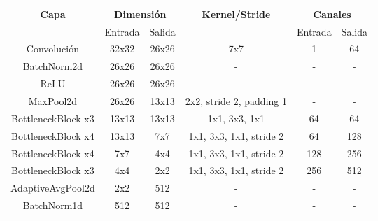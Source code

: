 \begin{table}[]
\begin{tabular}{|c|cc|c|cc|}
\hline
\multirow{2}{*}{\textbf{Capa}} & \multicolumn{2}{c|}{\textbf{Dimensión}}     & \multirow{2}{*}{\textbf{Kernel/Stride}} & \multicolumn{2}{c|}{\textbf{Canales}} \\ \cline{2-3} \cline{5-6} 
                               & \multicolumn{1}{c|}{Entrada} & Salida       &                                         & \multicolumn{1}{c|}{Entrada} & Salida \\ \hline
Convolución                    & \multicolumn{1}{c|}{32x32}   & 26x26        & 7x7                                     & \multicolumn{1}{c|}{1}       & 64     \\ \hline
BatchNorm2d                    & \multicolumn{1}{c|}{26x26}   & 26x26        & -                                       & \multicolumn{1}{c|}{-}        &   -     \\ \hline
ReLU                           & \multicolumn{1}{c|}{26x26}   & 26x26        & -                                       & \multicolumn{1}{c|}{-}        &  -      \\ \hline
MaxPool2d                      & \multicolumn{1}{c|}{26x26}   & 13x13        & 2x2, stride 2, padding 1                & \multicolumn{1}{c|}{-}        &   -     \\ \hline
BottleneckBlock x3             & \multicolumn{1}{c|}{13x13}   & 13x13        & 1x1, 3x3, 1x1                           & \multicolumn{1}{c|}{64}      & 64     \\ \hline
BottleneckBlock x4             & \multicolumn{1}{c|}{13x13}   & 7x7          & 1x1, 3x3, 1x1, stride 2                 & \multicolumn{1}{c|}{64}      & 128    \\ \hline
BottleneckBlock x4             & \multicolumn{1}{c|}{7x7}     & 4x4          & 1x1, 3x3, 1x1, stride 2                 & \multicolumn{1}{c|}{128}     & 256    \\ \hline
BottleneckBlock x3             & \multicolumn{1}{c|}{4x4}     & 2x2          & 1x1, 3x3, 1x1, stride 2                 & \multicolumn{1}{c|}{256}     & 512    \\ \hline
AdaptiveAvgPool2d              & \multicolumn{1}{c|}{2x2}     & 512          & -                                       & \multicolumn{1}{c|}{-}        & -       \\ \hline
BatchNorm1d                    & \multicolumn{1}{c|}{512}     & 512          & -                                       & \multicolumn{1}{c|}{-}        &  -      \\ \hline

\end{tabular}
\end{table}
